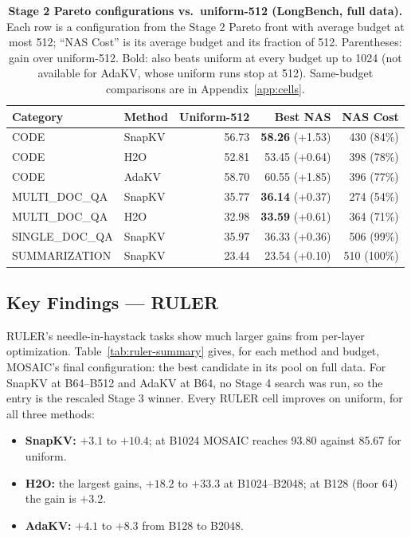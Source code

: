 \documentclass[11pt]{article}
\begin{document}
\begin{table}[t]
  \centering
  \small
  \setlength{\tabcolsep}{12pt}
  \begin{tabular}{@{} l l r r r @{}}
    \toprule
    \textbf{Category} & \textbf{Method} & \textbf{Uniform-512} & \textbf{Best NAS} & \textbf{NAS Cost} \\
    \midrule
    \rowcolor{gray!10}
    CODE & SnapKV & 56.73 & \textbf{58.26} (+1.53) & 430 (84\%) \\
    CODE & H2O & 52.81 & 53.45 (+0.64) & 398 (78\%) \\
    \rowcolor{gray!10}
    CODE & AdaKV & 58.70 & 60.55 (+1.85) & 396 (77\%) \\
    MULTI\_DOC\_QA & SnapKV & 35.77 & \textbf{36.14} (+0.37) & 274 (54\%) \\
    \rowcolor{gray!10}
    MULTI\_DOC\_QA & H2O & 32.98 & \textbf{33.59} (+0.61) & 364 (71\%) \\
    SINGLE\_DOC\_QA & SnapKV & 35.97 & 36.33 (+0.36) & 506 (99\%) \\
    \rowcolor{gray!10}
    SUMMARIZATION & SnapKV & 23.44 & 23.54 (+0.10) & 510 (100\%) \\
    \bottomrule
  \end{tabular}
  \caption{\textbf{Stage 2 Pareto configurations vs.\ uniform-512 (LongBench, full data).} Each row is a configuration from the Stage 2 Pareto front with average budget at most 512; ``NAS Cost'' is its average budget and its fraction of 512. Parentheses: gain over uniform-512. Bold: also beats uniform at every budget up to 1024 (not available for AdaKV, whose uniform runs stop at 512). Same-budget comparisons are in Appendix~\ref{app:cells}.}
  \label{tab:longbench-summary}
\end{table}

\subsection{Key Findings — RULER}

RULER's needle-in-haystack tasks show much larger gains from per-layer optimization. Table~\ref{tab:ruler-summary} gives, for each method and budget, MOSAIC's final configuration: the best candidate in its pool on full data. For SnapKV at B64--B512 and AdaKV at B64, no Stage 4 search was run, so the entry is the rescaled Stage 3 winner. Every RULER cell improves on uniform, for all three methods:

\begin{itemize}
\item \textbf{SnapKV:} $+3.1$ to $+10.4$; at B1024 MOSAIC reaches 93.80 against 85.67 for uniform.
\item \textbf{H2O:} the largest gains, $+18.2$ to $+33.3$ at B1024--B2048; at B128 (floor 64) the gain is $+3.2$.
\item \textbf{AdaKV:} $+4.1$ to $+8.3$ from B128 to B2048.
\end{itemize}
\end{document}

